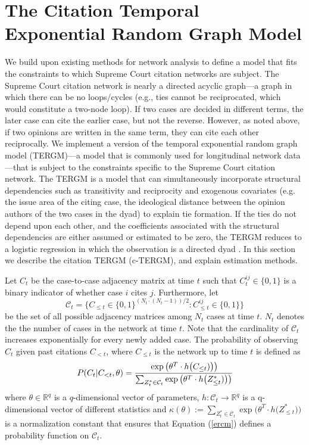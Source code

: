 \documentclass[headsepline=true, abstracton]{scrartcl}
\begin{document}
 \section{The Citation Temporal Exponential Random Graph Model}
We build upon existing methods for network analysis to define a model that fits the constraints to which Supreme Court citation networks are subject. The Supreme Court citation network is nearly a directed acyclic graph---a graph in which there can be no loops/cycles (e.g., ties cannot be reciprocated, which would constitute a two-node loop). If two cases are decided in different terms, the later case can cite the earlier case, but not the reverse. However, as noted above, if two opinions are written in the same term, they can cite each other reciprocally. We implement a version of the temporal exponential random graph model (TERGM)---a model that is commonly used for longitudinal network data \citep[e.g.,][]{cranmer2012complex,desmarais2013forecasting,clark2013multimember,block2018change,graif2017neighborhood}---that is subject to the constraints specific to the Supreme Court citation network. The TERGM is a model that can simultaneously incorporate structural dependencies such as transitivity and reciprocity and exogenous covariates  (e.g. the issue area of the citing case, the ideological distance between the opinion authors of the two cases in the dyad) to explain tie formation. If the ties do not depend upon each other, and the coefficients associated with the structural dependencies are either assumed or estimated to be zero, the TERGM reduces to a logistic regression in which the observation is a directed dyad \citep{cranmer2010inferential}.  In this section we describe the citation TERGM (c-TERGM), and explain estimation methods. 

Let $C_t$ be the case-to-case adjacency matrix at time $t$ such that $C_t^{ij} \in \{0,1\}$ is a binary indicator of whether case $i$ cites $j$. Furthermore, let
$$\mathcal{C}_t =\{C_{\leq t} \in \{0,1\}^{(N_t \cdot (N_t-1))/2}: C_{\leq t}^{ij} \in \{0,1\} \}$$ 
be the set of all possible adjacency matrices among $N_t$ cases at time $t$. $N_t$ denotes the the number of cases in the network at time $t$. Note that the cardinality of $\mathcal{C}_t$ increases exponentially for every newly added case. The probability of observing $C_t$ given past citations $C_{<t}$, where $C_{\leq t}$ is the network up to time $t$ is defined as
\begin{equation}
P(C_t | C_{<t}, \theta)=\cfrac{\exp\big(\theta^T\cdot h\big(C_{\leq t})\big)\big)}{\sum_{Z_t^*\in \mathcal{C}_t}\exp\big(\theta^T\cdot h\big(Z^*_{\leq t})\big)\big)}
\label{ercm}
\end{equation}
where $\theta \in \mathbb{R}^q$ is a $q$-dimensional vector of parameters,  $h: \mathcal{C}_t \to \mathbb{R}^q$ is a q-dimensional vector of different statistics and $\kappa(\theta) := \sum_{Z^*_t\in \mathcal{C}_t}\exp\big(\theta^T\cdot h\big(Z^*_{\leq t})\big)$ is a normalization constant that ensures that Equation (\ref{ercm}) defines a probability function on $\mathcal{C}_t$.
\end{document}
